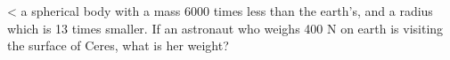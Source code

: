 <%
a spherical body with a mass 6000 times less than the
earth's, and a radius which is 13 times smaller.  If an
astronaut who weighs 400 N on earth is visiting the
surface of Ceres, what is her weight?
